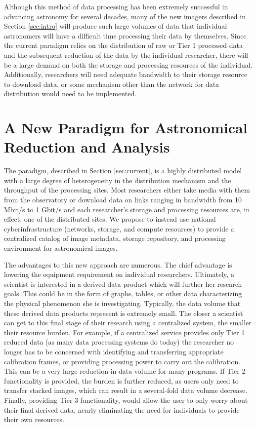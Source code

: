 \documentclass[10pt,conference]{IEEEtran}
\begin{document}
Although this method of data processing has been extremely successful in advancing astronomy for several decades, many of the new imagers described in Section \ref{sec:intro} will produce such large volumes of data that individual astronomers will have a difficult time processing their data by themselves. Since the current paradigm relies on the distribution of raw or Tier 1 processed data and the subsequent reduction of the data by the individual researcher, there will be a large demand on both the storage and processing resources of the individual. Additionally, researchers will need adequate bandwidth to their storage resource to download data, or some mechanism other than the network for data distribution would need to be implemented. 

\section{A New Paradigm for Astronomical Reduction and Analysis}\label{sec:rev}

The paradigm, described in Section \ref{sec:current}, is a highly distributed model with a large degree of heterogeneity in the distribution mechanism and the throughput of the processing sites. Most researchers either take media with them from the observatory or download data on links ranging in bandwidth from 10 Mbit/s to 1 Gbit/s and each researcher's storage and processing resources are, in effect, one of the distributed sites. We propose to instead use national cyberinfrastructure (networks, storage, and compute resources) to provide a centralized catalog of image metadata, storage repository, and processing environment for astronomical images. 

The advantages to this new approach are numerous. The chief advantage is lowering the equipment requirement on individual researchers. Ultimately, a scientist is interested in a derived data product which will further her research goals. This could be in the form of graphs, tables, or other data characterizing the physical phenomenon she is investigating. Typically, the data volume that these derived data products represent is extremely small. The closer a scientist can get to this final stage of their research using a centralized system, the smaller their resource burden. For example, if a centralized service provides only Tier 1 reduced data (as many data processing systems do today) the researcher no longer has to be concerned with identifying and transferring appropriate calibration frames, or providing processing power to carry out the calibration. This can be a very large reduction in data volume for many programs. If Tier 2 functionality is provided, the burden is further reduced, as users only need to transfer stacked images, which can result in a several-fold data volume decrease. Finally, providing Tier 3 functionality, would allow the user to only worry about their final derived data, nearly eliminating the need for individuals to provide their own resources. 
\end{document}
